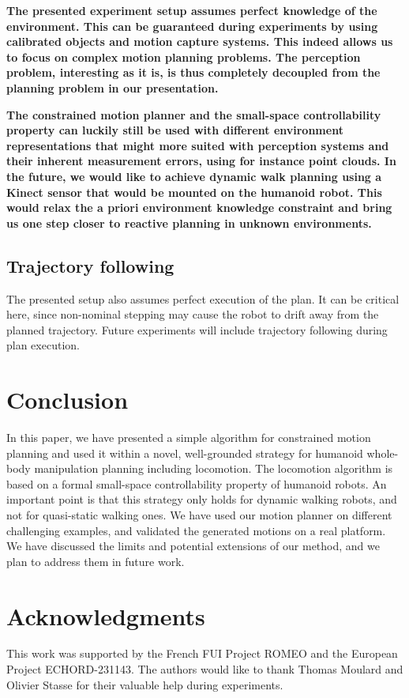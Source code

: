 \documentclass{article}
\begin{document}
\textbf{The presented experiment setup assumes perfect knowledge of
  the environment. This can be guaranteed during experiments by using
  calibrated objects and motion capture systems. This indeed allows us
  to focus on complex motion planning problems. The perception
  problem, interesting as it is, is thus completely decoupled from the
  planning problem in our presentation.}

\textbf{The constrained motion planner and the small-space
  controllability property can luckily still be used with different
  environment representations that might more suited with perception
  systems and their inherent measurement errors, using for instance
  point clouds. In the future, we would like to achieve dynamic walk
  planning using a Kinect sensor that would be mounted on the humanoid
  robot. This would relax the a priori environment knowledge
  constraint and bring us one step closer to reactive planning in
  unknown environments.}

\subsection{Trajectory following}

The presented setup also assumes perfect execution of the plan. It can
be critical here, since non-nominal stepping may cause the robot to
drift away from the planned trajectory. Future experiments will
include trajectory following during plan execution.

\section{Conclusion}

In this paper, we have presented a simple algorithm for constrained motion planning
and used it within a novel, well-grounded strategy for humanoid whole-body
manipulation planning including locomotion. The locomotion algorithm is based on a formal
small-space controllability property of humanoid robots. An important point is that
this strategy only holds for dynamic walking robots, and not for quasi-static walking ones.
We have used our motion planner on different challenging examples, and validated the
generated motions on a real platform. We have discussed the limits and potential extensions
of our method, and we plan to address them in future work.

\section{Acknowledgments}

This work was supported by the French FUI Project ROMEO and the European Project ECHORD-231143. The authors would like to thank Thomas Moulard and Olivier Stasse for their valuable help during experiments.


   



\end{document}
